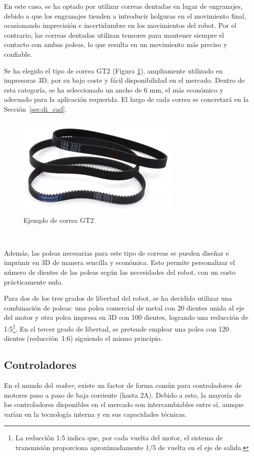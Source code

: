 En este caso, se ha optado por utilizar correas dentadas en lugar de engranajes, debido a que los engranajes 
tienden a introducir holguras en el movimiento final, ocasionando imprecisión e incertidumbre en los movimientos 
del robot. Por el contrario, las correas dentadas utilizan tensores para mantener siempre el contacto con 
ambas poleas, lo que resulta en un movimiento más preciso y confiable.

Se ha elegido el tipo de correa GT2 (Figura \ref{fig:correa}), ampliamente utilizado en impresoras 3D, por su bajo coste y fácil 
disponibilidad en el mercado. Dentro de esta categoría, se ha seleccionado un ancho de 6 mm, el más 
económico y adecuado para la aplicación requerida. El largo de cada correa se concretará en la \mbox{Sección \ref{sec:di_cad}}.
\begin{figure} [ht!]
  \begin{center}
    \includegraphics[width=8cm]{figs/correa.png}
  \end{center}
  \caption{Ejemplo de correa GT2}
  \label{fig:correa}
\end{figure}\ 

Además, las poleas necesarias para este tipo de correas se pueden diseñar e imprimir en 3D de manera 
sencilla y económica. Esto permite personalizar el número de dientes de las poleas según las 
necesidades del robot, con un costo prácticamente nulo.

Para dos de los tres grados de libertad del robot, se ha decidido utilizar una combinación de poleas: una polea comercial de 
metal con 20 dientes unida al eje del motor y otra polea impresa en 3D con 100 dientes, logrando una reducción de 1:5\footnote{
  La reducción 1:5 indica que, por cada vuelta del motor, el sistema de transmisión proporciona aproximadamente 1/5 de vuelta en el eje de salida.
}. En el 
tercer grado de libertad, se pretende emplear una polea con 120 dientes \mbox{(reducción 1:6)} siguiendo el mismo principio.

\subsection{Controladores}
\noindent En el mundo del \textit{maker}, existe un factor de forma común para controladores de motores paso a paso de baja corriente (hasta 2A). Debido a esto, 
la mayoría de los controladores disponibles en el mercado son intercambiables entre sí, aunque varían en la tecnología interna y en sus 
capacidades técnicas.

